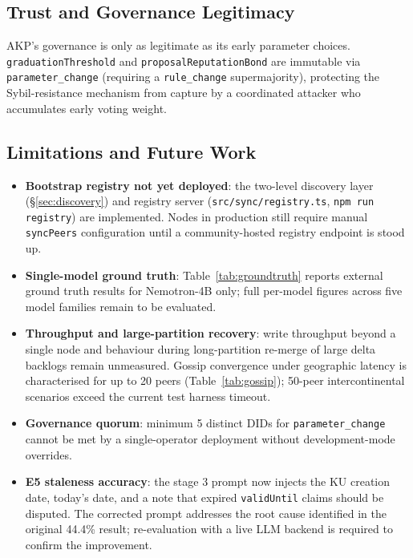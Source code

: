 \documentclass[10pt,twocolumn]{article}
\begin{document}
\subsection{Trust and Governance Legitimacy}

AKP's governance is only as legitimate as its early parameter choices.
\texttt{graduationThreshold} and \texttt{proposalReputationBond} are
immutable via \texttt{parameter\_change} (requiring a \texttt{rule\_change}
supermajority), protecting the Sybil-resistance mechanism from capture
by a coordinated attacker who accumulates early voting weight.

\subsection{Limitations and Future Work}

\begin{itemize}[noitemsep,topsep=2pt]
  \item \textbf{Bootstrap registry not yet deployed}: the two-level
        discovery layer (§\ref{sec:discovery}) and registry server
        (\texttt{src/sync/registry.ts}, \texttt{npm run registry}) are
        implemented. Nodes in production still require manual
        \texttt{syncPeers} configuration until a community-hosted registry
        endpoint is stood up.
  \item \textbf{Single-model ground truth}: Table~\ref{tab:groundtruth}
        reports external ground truth results for Nemotron-4B only; full
        per-model figures across five model families remain to be evaluated.
  \item \textbf{Throughput and large-partition recovery}: write throughput
        beyond a single node and behaviour during long-partition re-merge of
        large delta backlogs remain unmeasured. Gossip convergence under
        geographic latency is characterised for up to 20 peers
        (Table~\ref{tab:gossip}); 50-peer intercontinental scenarios exceed
        the current test harness timeout.
  \item \textbf{Governance quorum}: minimum 5 distinct DIDs for
        \texttt{parameter\_change} cannot be met by a single-operator
        deployment without development-mode overrides.
  \item \textbf{E5 staleness accuracy}: the stage 3 prompt now injects the
        KU creation date, today's date, and a note that expired
        \texttt{validUntil} claims should be disputed. The corrected
        prompt addresses the root cause identified in the original 44.4\%
        result; re-evaluation with a live LLM backend is required to
        confirm the improvement.
\end{itemize}
\end{document}
